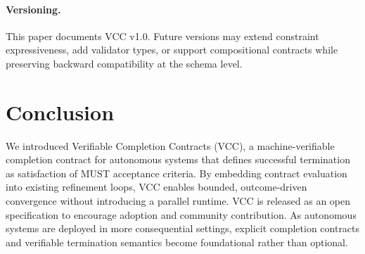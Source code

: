 \documentclass[11pt]{article}
\begin{document}
\paragraph{Versioning.} This paper documents VCC v1.0. Future versions may extend constraint expressiveness, add validator types, or support compositional contracts while preserving backward compatibility at the schema level.

\section{Conclusion}
We introduced Verifiable Completion Contracts (VCC), a machine-verifiable completion contract for autonomous systems that defines successful termination as satisfaction of MUST acceptance criteria. By embedding contract evaluation into existing refinement loops, VCC enables bounded, outcome-driven convergence without introducing a parallel runtime. VCC is released as an open specification to encourage adoption and community contribution. As autonomous systems are deployed in more consequential settings, explicit completion contracts and verifiable termination semantics become foundational rather than optional.



\end{document}
